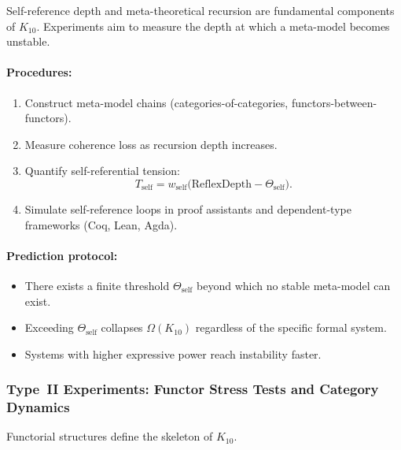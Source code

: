 Self-reference depth and meta-theoretical recursion are fundamental 
components of $K_{10}$.  
Experiments aim to measure the depth at which a meta-model becomes 
unstable.

\paragraph{Procedures:}

\begin{enumerate}
    \item Construct meta-model chains (categories-of-categories, 
          functors-between-functors).
    \item Measure coherence loss as recursion depth increases.
    \item Quantify self-referential tension:
          \[
              T_{\mathrm{self}} = 
              w_{\mathrm{self}}\bigl(
                 \mathrm{ReflexDepth} - \Theta_{\mathrm{self}}
              \bigr).
          \]
    \item Simulate self-reference loops in proof assistants and 
          dependent-type frameworks (Coq, Lean, Agda).
\end{enumerate}

\paragraph{Prediction protocol:}

\begin{itemize}
    \item There exists a finite threshold $\Theta_{\mathrm{self}}$ beyond 
          which no stable meta-model can exist.
    \item Exceeding $\Theta_{\mathrm{self}}$ collapses 
          $\Omega(K_{10})$ regardless of the specific formal system.
    \item Systems with higher expressive power reach instability faster.
\end{itemize}



\subsubsection{Type~II Experiments: Functor Stress Tests and Category Dynamics}

Functorial structures define the skeleton of $K_{10}$.

